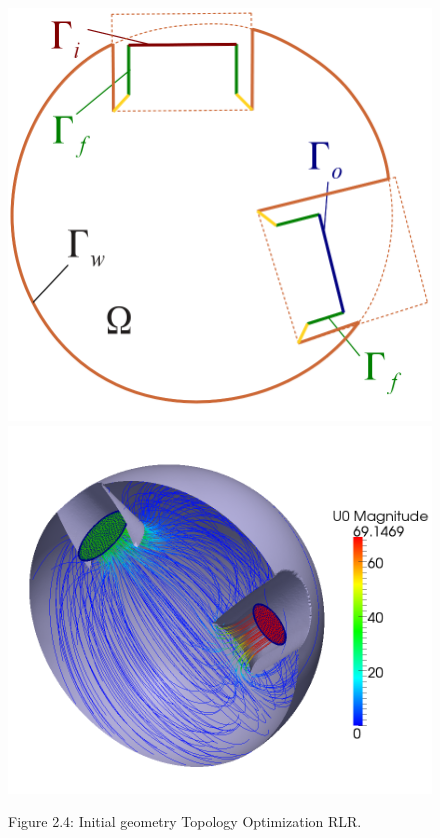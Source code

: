 \documentclass[oneside]{article}
\numberwithin{equation}{section}
\numberwithin{figure}{section}
\numberwithin{figure}{section}
\begin{document}
\begin{figure}[htbp]
    \centering
    \includegraphics[scale=0.42]{TopoStartgeometrieSkizze.png}
    \includegraphics[scale=0.15]{TopoStartgeometrie.png}
    \caption{Figure 2.4: Initial geometry Topology Optimization RLR.}
    \label{AnfangTopo}
\end{figure}
\end{document}
